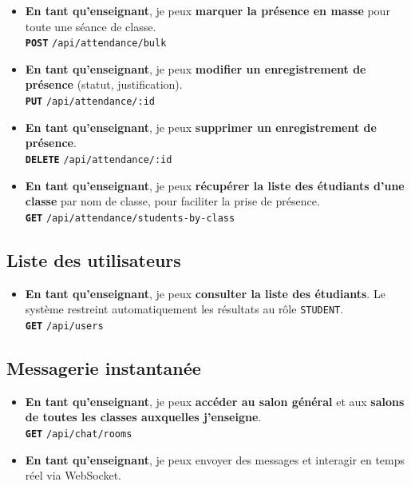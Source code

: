 \documentclass[12pt,a4paper]{article}
\newcommand{\route}[1]{\texorpdfstring{\texttt{\small\color{routeGray}#1}}{#1}}
\newcommand{\httpmethod}[1]{%
  \ifstrequal{#1}{GET}{\colorbox{blue!15}{\texttt{\bfseries\color{blue!70!black}GET}}}{}%
  \ifstrequal{#1}{POST}{\colorbox{green!18}{\texttt{\bfseries\color{green!60!black}POST}}}{}%
  \ifstrequal{#1}{PUT}{\colorbox{orange!18}{\texttt{\bfseries\color{orange!70!black}PUT}}}{}%
  \ifstrequal{#1}{DELETE}{\colorbox{red!15}{\texttt{\bfseries\color{red!70!black}DELETE}}}{}%
}
\newcommand{\usmark}{\color{accentGold}$\blacktriangleright$\;}
\begin{document}
\begin{teacherbox}
\begin{itemize}[leftmargin=1.2cm, labelsep=0.4cm]
  \item[\usmark] \textbf{En tant qu'enseignant}, je peux \textbf{marquer la présence en masse} pour toute une séance de classe.\\
    \httpmethod{POST} \route{/api/attendance/bulk}

  \item[\usmark] \textbf{En tant qu'enseignant}, je peux \textbf{modifier un enregistrement de présence} (statut, justification).\\
    \httpmethod{PUT} \route{/api/attendance/:id}

  \item[\usmark] \textbf{En tant qu'enseignant}, je peux \textbf{supprimer un enregistrement de présence}.\\
    \httpmethod{DELETE} \route{/api/attendance/:id}

  \item[\usmark] \textbf{En tant qu'enseignant}, je peux \textbf{récupérer la liste des étudiants d'une classe} par nom de classe, pour faciliter la prise de présence.\\
    \httpmethod{GET} \route{/api/attendance/students-by-class}
\end{itemize}

\subsection*{Liste des utilisateurs}

\begin{itemize}[leftmargin=1.2cm, labelsep=0.4cm]
  \item[\usmark] \textbf{En tant qu'enseignant}, je peux \textbf{consulter la liste des étudiants}. Le système restreint automatiquement les résultats au rôle \texttt{STUDENT}.\\
    \httpmethod{GET} \route{/api/users}
\end{itemize}

\subsection*{Messagerie instantanée}

\begin{itemize}[leftmargin=1.2cm, labelsep=0.4cm]
  \item[\usmark] \textbf{En tant qu'enseignant}, je peux \textbf{accéder au salon général} et aux \textbf{salons de toutes les classes auxquelles j'enseigne}.\\
    \httpmethod{GET} \route{/api/chat/rooms}

  \item[\usmark] \textbf{En tant qu'enseignant}, je peux envoyer des messages et interagir en temps réel via WebSocket.
\end{itemize}

\end{teacherbox}
\end{document}
